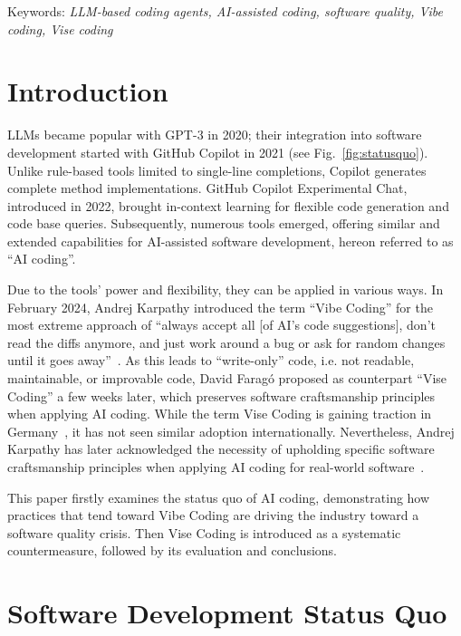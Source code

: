 \documentclass[twocolumn,german]{article}
\begin{document}
Keywords: {\em LLM-based coding agents, AI-assisted coding, software quality, Vibe coding, Vise coding}

\section{Introduction}

LLMs became popular with GPT-3 in 2020;
their integration into software development started with GitHub Copilot in 2021 (see Fig.~\ref{fig:statusquo}). 
Unlike rule-based tools limited to single-line completions, Copilot generates complete method implementations.
GitHub Copilot Experimental Chat, introduced in 2022,
brought in-context learning for flexible code generation and code base queries. 
Subsequently, numerous tools emerged, offering similar and extended capabilities for
AI-assisted software development, hereon referred to as ``AI coding''.

Due to the tools' power and flexibility, they can be applied in various ways.
In February 2024, Andrej Karpathy introduced the term ``Vibe Coding'' for the most extreme approach of
``always accept all [of AI's code suggestions], don't read the diffs anymore, and just work around a bug
or ask for random changes until it goes away''~\cite{AK25}.
As this leads to ``write-only'' code, i.e. not readable, maintainable, or improvable code,
David Farag\'{o} proposed as counterpart ``Vise Coding'' a few weeks later,  
which preserves software craftsmanship principles when applying AI coding.
While the term Vise Coding is gaining traction in Germany~\cite{URL:ViseWikipediaDe},
it has not seen similar adoption internationally.
Nevertheless, Andrej Karpathy has later acknowledged the necessity of upholding
specific software craftsmanship principles when applying AI coding for real-world software~\cite{AK25c,AK25b}.

This paper firstly examines the status quo of AI coding,
demonstrating how practices that tend toward Vibe Coding are driving the industry toward a software quality crisis. 
Then Vise Coding is introduced as a systematic countermeasure, followed by its evaluation and conclusions.

\section{Software Development Status Quo}
\end{document}
